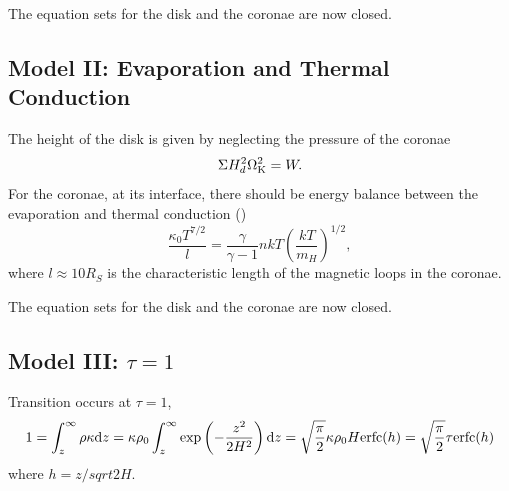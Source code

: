 \documentclass[oneside]{book}
\def\rd{{\rm d}}
\begin{document}
The equation sets for the disk and the coronae are now closed.

\subsection{Model II: Evaporation and Thermal Conduction}
The height of the disk is given by neglecting the pressure of the coronae
\begin{equation}
\Sigma H_d^2\Omega_{\rm K}^2=W.
\end{equation}
For the coronae, at its interface, there should be energy balance between the 
evaporation and thermal conduction (\citealt{Liu2002})
\begin{equation}
\frac{\kappa_0 T^{7/2}}{l}=\frac{\gamma}{\gamma-1}nkT\left(\frac{kT}{m_H}\right)^{1/2},
\end{equation}
where {\color{blue}$l\approx10R_S$} is the characteristic length of the magnetic loops in the coronae.

The equation sets for the disk and the coronae are now closed.

\subsection{Model III: $\tau=1$}
Transition occurs at $\tau=1$,
\begin{equation}
1=\int_{z}^{\infty}\rho \kappa \rd z=\kappa\rho_0\int_{z}^{\infty}\exp\left(-\frac{z^2}{2H^2}\right) \rd z
=\sqrt{\frac{\pi}{2}}\kappa\rho_0 H{\rm erfc}(h)=\sqrt{\frac{\pi}{2}}\tau{\rm erfc}(h)
\end{equation}
where $h=z/sqrt{2}H$.
\end{document}
